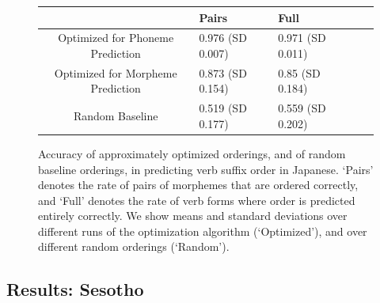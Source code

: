 \documentclass[11pt,letterpaper]{article}
\begin{document}
\begin{figure}
\begin{center}
\begin{tabular}{c||llll}
             &       Pairs & Full \\ \hline\hline
Optimized for Phoneme Prediction   &   0.976 (SD 0.007) & 0.971 (SD 0.011) \\
Optimized for Morpheme Prediction  &   0.873 (SD 0.154) & 0.85 (SD 0.184) \\
Random Baseline     &  0.519 (SD 0.177) & 0.559 (SD 0.202) \\
\end{tabular}
\end{center}
\caption{Accuracy of approximately optimized orderings, and of random baseline orderings, in predicting verb suffix order in Japanese. `Pairs' denotes the rate of pairs of morphemes that are ordered correctly, and `Full' denotes the rate of verb forms where order is predicted entirely correctly. We show means and standard deviations over different runs of the optimization algorithm (`Optimized'), and over different random orderings (`Random').}\label{fig:acc-japanese}
\end{figure}


\subsection{Results: Sesotho}
\end{document}
